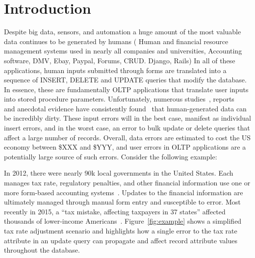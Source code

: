 
\section{Introduction}
\label{s:intro}


Despite big data, sensors, and automation a huge amount of the most valuable data continues to be generated by humans 
        ( Human and financial resource management systems used in nearly all companies and universities,
         Accounting software,
         DMV,
         Ebay, Paypal, 
         Forums,
         CRUD.  Django, Rails)
In all of these applications, human inputs submitted through forms are translated into a sequence of INSERT, DELETE and UPDATE queries that modify the database.
In essence, these are fundamentally OLTP applications that translate user inputs into stored procedure parameters.
Unfortunately, numerous studies~\cite{heersurvey,hildasurvey,sciencdirect (http://www.sciencedirect.com/science/article/pii/S0747563211000707)}, reports~\cite{citibank} and anecdotal evidence have consistently found~\cite{heerstudy,http://www.sciencedirect.com/science/article/pii/S0747563211000707} that human-generated data can be incredibly dirty.
These input errors will in the best case, manifest as individual insert errors, and in the worst case, an error to bulk update or delete queries that affect a large number of records.
Overall, data errors are estimated to cost the US economy between \$XXX and \$YYY, and user errors in OLTP applications are a potentially large source of such errors.
Consider the following example:


\begin{example}\label{ex:taxes}
In 2012, there were nearly 90k local governments in the United States.  Each manages tax rate, regulatory penalties, and other financial information use one or more form-based accounting systems~\cite{https://tax.thomsonreuters.com/new-systems-for-government-revenue-management/ }.  Updates to the financial information are ultimately managed through manual form entry and susceptible to error.  Most recently in 2015, a “tax mistake, affecting taxpayers in 37 states” affected thousands of lower-income Americans~\cite{http://www.nytimes.com/2015/02/21/us/incorrect-tax-information-health-insurance.html}.  
Figure~\ref{fig:example} shows a simplified tax rate adjustment scenario and highlights how a single error to the tax rate attribute in an update query can propagate and affect record attribute values throughout the database.
\end{example}

